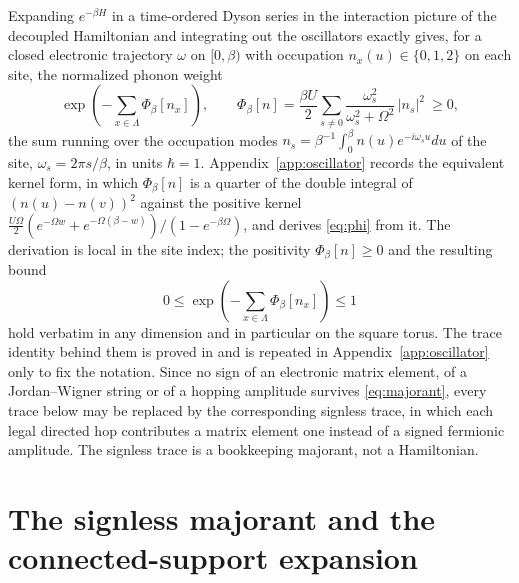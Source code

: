 \documentclass[11pt]{article}
\theoremstyle{plain}
\theoremstyle{definition}
\begin{document}
Expanding $e^{-\beta H}$ in a time-ordered Dyson series in the interaction picture of
the decoupled Hamiltonian and integrating out the oscillators exactly gives, for a
closed electronic trajectory $\omega$ on $[0,\beta)$ with occupation
$n_x(u)\in\{0,1,2\}$ on each site, the normalized phonon weight
\begin{equation}\label{eq:phi}
\exp\!\left(-\sum_{x\in\Lambda}\Phi_\beta[n_x]\right),\qquad
\Phi_\beta[n]=\frac{\beta U}{2}\sum_{s\ne0}
\frac{\omega_s^{2}}{\omega_s^{2}+\Omega^{2}}\,|n_s|^{2}\ \ge0,
\end{equation}
the sum running over the occupation modes $n_s=\beta^{-1}\int_0^{\beta}
n(u)e^{-i\omega_su}du$ of the site, $\omega_s=2\pi s/\beta$, in units $\hbar=1$.
Appendix~\ref{app:oscillator} records the equivalent kernel form, in which
$\Phi_\beta[n]$ is a quarter of the double integral of $(n(u)-n(v))^{2}$ against the
positive kernel $\tfrac{U\Omega}{2}(e^{-\Omega w}+e^{-\Omega(\beta-w)})
/(1-e^{-\beta\Omega})$, and derives \eqref{eq:phi} from it. The derivation is local
in the site index; the positivity $\Phi_\beta[n]\ge0$ and the resulting bound
\begin{equation}\label{eq:majorant}
0\le\exp\!\left(-\sum_{x\in\Lambda}\Phi_\beta[n_x]\right)\le1
\end{equation}
hold verbatim in any dimension and in particular on the square torus. The trace
identity behind them is proved in \cite[Section 3]{rens2026a} and is repeated in
Appendix~\ref{app:oscillator} only to fix the notation. Since no sign of an
electronic matrix element, of a Jordan--Wigner
string or of a hopping amplitude survives \eqref{eq:majorant}, every trace below may
be replaced by the corresponding signless trace, in which each legal directed hop
contributes a matrix element one instead of a signed fermionic amplitude. The
signless trace is a bookkeeping majorant, not a Hamiltonian.

\section{The signless majorant and the connected-support expansion}
\label{sec:supports}
\end{document}
